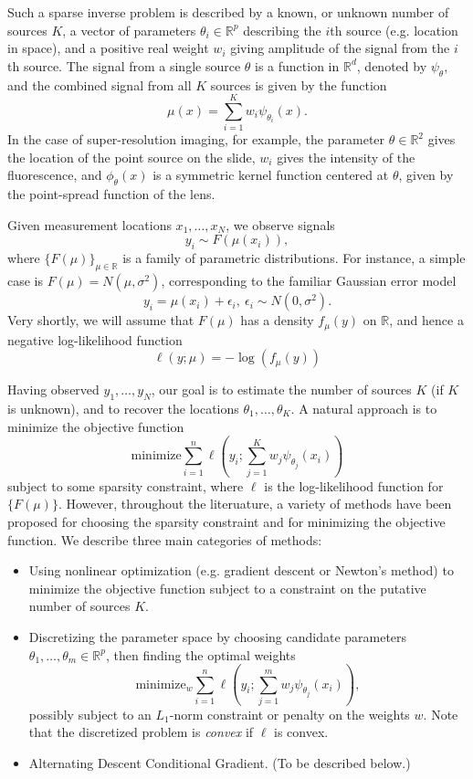\documentclass[11pt]{article}
\begin{document}
Such a sparse inverse problem is described by a known,
or unknown number of sources $K$, a vector of parameters $\theta_i \in
\mathbb{R}^p$ describing the $i$th source (e.g. location in space),
and a positive real weight $w_i$ giving amplitude of the signal from
the $i$th source.  The signal from a single source $\theta$ is a
function in $\mathbb{R}^d$, denoted by $\psi_\theta$,
and the combined signal from all $K$ sources is given by the function
\[
\mu(x) = \sum_{i=1}^K w_i \psi_{\theta_i}(x).
\]
In the case of super-resolution imaging, for example, the parameter
$\theta \in \mathbb{R}^2$ gives the location of the point source on
the slide, $w_i$ gives the intensity of the fluorescence, and
$\phi_{\theta}(x)$ is a symmetric kernel function centered at $\theta$,
given by the point-spread function of the lens.

Given measurement locations $x_1,\hdots, x_N$, we observe signals
\[
y_i \sim F(\mu(x_i)),
\]
where $\{F(\mu)\}_{\mu \in \mathbb{R}}$ is a family of parametric distributions.
For instance, a simple case is $F(\mu) = N(\mu, \sigma^2)$, corresponding to the familiar Gaussian error model
\[
y_i = \mu(x_i) + \epsilon_i, \ \epsilon_i \sim N(0, \sigma^2).
\]
Very shortly, we will assume that $F(\mu)$ has a density $f_\mu(y)$ on $\mathbb{R}$,
and hence a negative log-likelihood function
\[
\ell(y; \mu) = -\log(f_\mu(y))
\]

Having observed $y_1,\hdots, y_N$, our goal is to estimate the number
of sources $K$ (if $K$ is unknown), and to recover the locations
$\theta_1,\hdots, \theta_K$.
A natural approach is to minimize the objective function
\[
\text{minimize} \sum_{i=1}^n \ell\left(y_i; \sum_{j=1}^K w_j \psi_{\theta_j}(x_i) \right)
\]
subject to some sparsity constraint, where $\ell$ is the
log-likelihood function for $\{F(\mu)\}$.  However, throughout the
literuature, a variety of methods have been proposed for choosing the
sparsity constraint and for minimizing the objective function.
We describe three main categories of methods:
\begin{itemize}
\item Using nonlinear optimization (e.g. gradient descent or Newton's
  method) to minimize the objective function subject to a constraint
  on the putative number of sources $K$.
\item Discretizing the parameter space by choosing candidate
  parameters $\theta_1,\hdots, \theta_m \in \mathbb{R}^p$, then finding the optimal weights
\[
\text{minimize}_w \sum_{i=1}^n \ell\left(y_i; \sum_{j=1}^m w_j \psi_{\theta_j}(x_i) \right),
\]
possibly subject to an $L_1$-norm constraint or penalty on the weights $w$.
Note that the discretized problem is \emph{convex} if $\ell$ is convex.
\item Alternating Descent Conditional Gradient.  (To be described below.)
\end{itemize}
\end{document}
